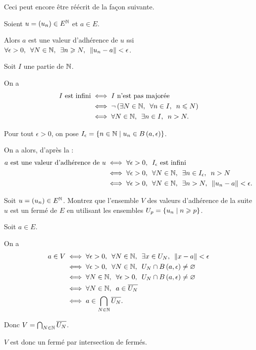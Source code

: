 Ceci peut encore être réécrit de la façon suivante.

\begin{prop}
Soient \(u=\left(u_n\right)\in E^{\mathbb{N}}\) et \(a\in E\).

Alors \(a\) est une valeur d'adhérence de \(u\) ssi \(\quantifs{\forall\epsilon>0;\forall N\in\N;\exists n\geq N}\norme{u_n-a}<\epsilon\).
\end{prop}

\begin{dem}
Soit \(I\) une partie de \(\mathbb{N}\).

On a \[\begin{aligned}
I\text{ est infini}&\ssi I\text{ n'est pas majorée} \\
&\ssi\non\paren{\quantifs{\exists N\in\N;\forall n\in I}n\leq N} \\
&\ssi\quantifs{\forall N\in\N;\exists n\in I}n>N.
\end{aligned}\]

Pour tout \(\epsilon>0\), on pose \(I_\epsilon=\accol{n\in\N\tq u_n\in\bouleo{a}{\epsilon}}\).

On a alors, d'après la  : \[\begin{aligned}
a\text{ est une valeur d'adhérence de }u&\ssi\quantifs{\forall\epsilon>0}I_\epsilon\text{ est infini} \\
&\ssi\quantifs{\forall\epsilon>0;\forall N\in\N;\exists n\in I_\epsilon}n>N \\
&\ssi\quantifs{\forall\epsilon>0;\forall N\in\N;\exists n>N}\norme{u_n-a}<\epsilon.
\end{aligned}\]
\end{dem}

\begin{exo}
Soit \(u=\left(u_n\right)\in E^{\mathbb{N}}\). Montrez que l'ensemble \(V\) des valeurs d'adhérence de la suite \(u\) est un fermé de \(E\) en utilisant les ensembles \(U_p=\left\lbrace u_n\;\middle|\; n\geqslant p\right\rbrace\).
\end{exo}

\begin{corr}
Soit \(a\in E\).

On a \[\begin{aligned}
a\in V&\ssi\quantifs{\forall\epsilon>0;\forall N\in\N;\exists x\in U_N}\norme{x-a}<\epsilon \\
&\ssi\quantifs{\forall\epsilon>0;\forall N\in\N}U_N\inter\bouleo{a}{\epsilon}\not=\ensvide \\
&\ssi\quantifs{\forall N\in\N;\forall\epsilon>0}U_N\inter\bouleo{a}{\epsilon}\not=\ensvide \\
&\ssi\quantifs{\forall N\in\N}a\in\conj{U_N} \\
&\ssi a\in\biginter_{N\in\N}\conj{U_N}.
\end{aligned}\]

Donc \(V=\bigcap_{N\in\mathbb{N}}\overline{U_N}\).

\(V\) est donc un fermé par intersection de fermés.
\end{corr}


